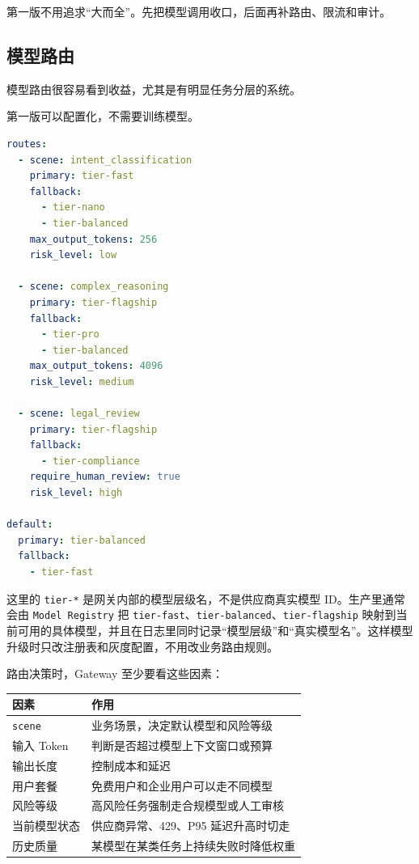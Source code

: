 \documentclass[10pt,a4paper]{ctexart}
\begin{document}
第一版不用追求“大而全”。先把模型调用收口，后面再补路由、限流和审计。



\subsection{模型路由}


模型路由很容易看到收益，尤其是有明显任务分层的系统。



第一版可以配置化，不需要训练模型。



\begin{lstlisting}[language=yaml]
routes:
  - scene: intent_classification
    primary: tier-fast
    fallback:
      - tier-nano
      - tier-balanced
    max_output_tokens: 256
    risk_level: low

  - scene: complex_reasoning
    primary: tier-flagship
    fallback:
      - tier-pro
      - tier-balanced
    max_output_tokens: 4096
    risk_level: medium

  - scene: legal_review
    primary: tier-flagship
    fallback:
      - tier-compliance
    require_human_review: true
    risk_level: high

default:
  primary: tier-balanced
  fallback:
    - tier-fast
\end{lstlisting}



这里的 \texttt{tier-*} 是网关内部的模型层级名，不是供应商真实模型 ID。生产里通常会由 \texttt{Model Registry} 把 \texttt{tier-fast}、\texttt{tier-balanced}、\texttt{tier-flagship} 映射到当前可用的具体模型，并且在日志里同时记录“模型层级”和“真实模型名”。这样模型升级时只改注册表和灰度配置，不用改业务路由规则。



路由决策时，Gateway 至少要看这些因素：


{\footnotesize
\begin{tabularx}{\textwidth}{|X|X|}
\hline
\textbf{因素} & \textbf{作用} \\
\hline
\texttt{scene} & 业务场景，决定默认模型和风险等级 \\
\hline
输入 Token & 判断是否超过模型上下文窗口或预算 \\
\hline
输出长度 & 控制成本和延迟 \\
\hline
用户套餐 & 免费用户和企业用户可以走不同模型 \\
\hline
风险等级 & 高风险任务强制走合规模型或人工审核 \\
\hline
当前模型状态 & 供应商异常、429、P95 延迟升高时切走 \\
\hline
历史质量 & 某模型在某类任务上持续失败时降低权重 \\
\hline
\end{tabularx}
}
\end{document}
